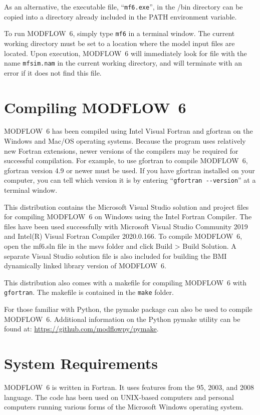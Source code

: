 \documentclass[11pt,twoside,twocolumn]{usgsreport}
\begin{document}
As an alternative, the executable file, ``\texttt{mf6.exe}'', in the \modflowversion{}/bin directory can be copied into a directory already included in the PATH environment variable.

To run MODFLOW~6, simply type \texttt{mf6} in a terminal window.  The current working directory must be set to a location where the model input files are located.  Upon execution, MODFLOW~6 will immediately look for file with the name \texttt{mfsim.nam} in the current working directory, and will terminate with an error if it does not find this file.

\section{Compiling MODFLOW~6}
MODFLOW~6 has been compiled using Intel Visual Fortran and gfortran on the Windows and Mac/OS operating systems.  Because the program uses relatively new Fortran extensions, newer versions of the compilers may be required for successful compilation.  For example, to use gfortran to compile MODFLOW~6, gfortran version 4.9 or newer must be used.  If you have gfortran installed on your computer, you can tell which version it is by entering ``\verb|gfortran --version|'' at a terminal window.

This distribution contains the Microsoft Visual Studio solution and project files for compiling MODFLOW~6 on Windows using the Intel Fortran Compiler.  The files have been used successfully with Microsoft Visual Studio Community 2019 and Intel(R) Visual Fortran Compiler 2020.0.166.  To compile MODFLOW~6, open the mf6.sln file in the msvs folder and click Build >  Build Solution.  A separate Visual Studio solution file is also included for building the BMI dynamically linked library version of MODFLOW~6.

This distribution also comes with a makefile for compiling MODFLOW~6 with \texttt{gfortran}.  The makefile is contained in the \texttt{make} folder.

For those familiar with Python, the pymake package can also be used to compile MODFLOW~6.  Additional information on the Python pymake utility can be found at: \url{https://github.com/modflowpy/pymake}.  

\section{System Requirements}
MODFLOW~6 is written in Fortran.  It uses features from the 95, 2003, and 2008 language.  The code has been used on UNIX-based computers and personal computers running various forms of the Microsoft Windows operating system.
\end{document}
